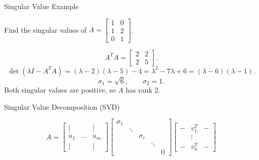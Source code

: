 \documentclass[10pt]{beamer}
\begin{document}
\begin{frame}{Singular Value Example}
\begin{example}
Find the singular values of
$A=\begin{bmatrix}1&0\\1&2\\0&1\end{bmatrix}$.
\end{example}
\[
A^TA=\begin{bmatrix}2&2\\2&5\end{bmatrix}.
\]
\[
\det(\lambda I-A^TA)=(\lambda-2)(\lambda-5)-4
=\lambda^2-7\lambda+6=(\lambda-6)(\lambda-1).
\]
\[
\boxed{\sigma_1=\sqrt6,\qquad \sigma_2=1.}
\]
Both singular values are positive, so $A$ has rank $2$.
\end{frame}



\begin{frame}{Singular Value Decomposition (SVD) }


{}

\[
A =
\begin{bmatrix}
    | &  & | \\
    u_1    & \dots  & u_m \\
    | &   & |
\end{bmatrix}
\begin{bmatrix}
    \sigma_1 &        &          &        &\\
             & \ddots &          &        & \\
             &        & \sigma_r &        & \\
             &        &          & \ddots & \\
             &        &          &        & 0 
\end{bmatrix}
\begin{bmatrix}
    - & v_1^T & -\\
     & \vdots & \\
    - & v_n^T & -
\end{bmatrix}
\]
\end{frame}
\end{document}

